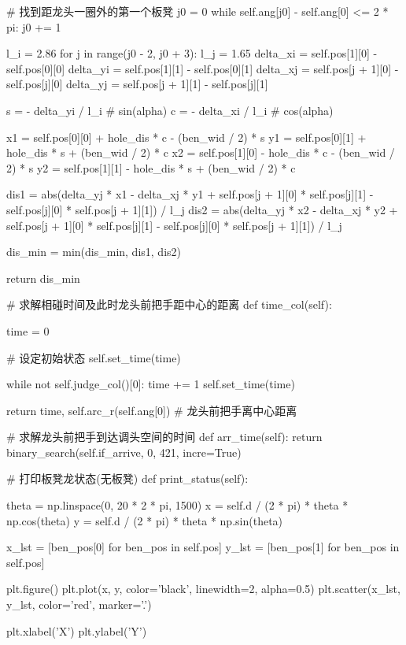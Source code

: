 \documentclass[withoutpreface,bwprint]{cumcmthesis}
\begin{document}
\begin{CodeText}
   # 找到距龙头一圈外的第一个板凳
   j0 = 0
   while self.ang[j0] - self.ang[0] <= 2 * pi:
      j0 += 1

   l_i = 2.86
   for j in range(j0 - 2, j0 + 3):
      l_j = 1.65
      delta_xi = self.pos[1][0] - self.pos[0][0]
      delta_yi = self.pos[1][1] - self.pos[0][1]
      delta_xj = self.pos[j + 1][0] - self.pos[j][0]
      delta_yj = self.pos[j + 1][1] - self.pos[j][1]

      s = - delta_yi / l_i # sin(alpha)
      c = - delta_xi / l_i # cos(alpha)

      x1 = self.pos[0][0] + hole_dis * c - (ben_wid / 2) * s
      y1 = self.pos[0][1] + hole_dis * s + (ben_wid / 2) * c
      x2 = self.pos[1][0] - hole_dis * c - (ben_wid / 2) * s
      y2 = self.pos[1][1] - hole_dis * s + (ben_wid / 2) * c

      dis1 = abs(delta_yj * x1 - delta_xj * y1 + self.pos[j + 1][0] * self.pos[j][1] -
                  self.pos[j][0] * self.pos[j + 1][1]) / l_j
      dis2 = abs(delta_yj * x2 - delta_xj * y2 + self.pos[j + 1][0] * self.pos[j][1] -
                  self.pos[j][0] * self.pos[j + 1][1]) / l_j

      dis_min = min(dis_min, dis1, dis2)

   return dis_min

# 求解相碰时间及此时龙头前把手距中心的距离
def time_col(self):


   time = 0

   # 设定初始状态
   self.set_time(time)

   while not self.judge_col()[0]:
      time += 1
      self.set_time(time)

   return time, self.arc_r(self.ang[0]) # 龙头前把手离中心距离

# 求解龙头前把手到达调头空间的时间
def arr_time(self):
   return binary_search(self.if_arrive, 0, 421, incre=True)

# 打印板凳龙状态(无板凳)
def print_status(self):

   theta = np.linspace(0, 20 * 2 * pi, 1500)
   x = self.d / (2 * pi) * theta * np.cos(theta)
   y = self.d / (2 * pi) * theta * np.sin(theta)

   x_lst = [ben_pos[0] for ben_pos in self.pos]
   y_lst = [ben_pos[1] for ben_pos in self.pos]

   plt.figure()
   plt.plot(x, y, color='black', linewidth=2, alpha=0.5)
   plt.scatter(x_lst, y_lst, color='red', marker='.')

   plt.xlabel('X')
   plt.ylabel('Y')


\end{CodeText}
\end{document}
